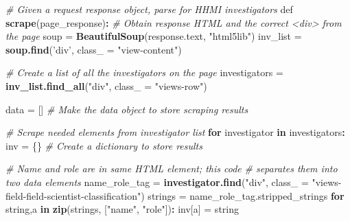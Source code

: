 \documentclass[]{krantz}
\newenvironment{Shaded}{\begin{snugshade}}{\end{snugshade}}
\newcommand{\KeywordTok}[1]{\textcolor[rgb]{0.13,0.29,0.53}{\textbf{#1}}}
\newcommand{\DataTypeTok}[1]{\textcolor[rgb]{0.13,0.29,0.53}{#1}}
\newcommand{\StringTok}[1]{\textcolor[rgb]{0.31,0.60,0.02}{#1}}
\newcommand{\CommentTok}[1]{\textcolor[rgb]{0.56,0.35,0.01}{\textit{#1}}}
\newcommand{\ControlFlowTok}[1]{\textcolor[rgb]{0.13,0.29,0.53}{\textbf{#1}}}
\newcommand{\OperatorTok}[1]{\textcolor[rgb]{0.81,0.36,0.00}{\textbf{#1}}}
\newcommand{\NormalTok}[1]{#1}
\begin{document}
\enlargethispage{12pt}

\begin{Shaded}
\begin{Highlighting}[]
\CommentTok{# Given a request response object, parse for HHMI investigators}
\NormalTok{def }\KeywordTok{scrape}\NormalTok{(page_response)}\OperatorTok{:}
\StringTok{   }\CommentTok{# Obtain response HTML and the correct <div> from the page}
\StringTok{   }\NormalTok{soup =}\StringTok{ }\KeywordTok{BeautifulSoup}\NormalTok{(response.text, }\StringTok{"html5lib"}\NormalTok{)}
\NormalTok{   inv_list =}\StringTok{ }\KeywordTok{soup.find}\NormalTok{(}\StringTok{'div'}\NormalTok{, }\DataTypeTok{class_ =} \StringTok{"view-content"}\NormalTok{)}

   \CommentTok{# Create a list of all the investigators on the page}
\NormalTok{   investigators =}\StringTok{ }\KeywordTok{inv_list.find_all}\NormalTok{(}\StringTok{"div"}\NormalTok{, }\DataTypeTok{class_ =} \StringTok{"views-row"}\NormalTok{)}

\NormalTok{   data =}\StringTok{ }\NormalTok{[] }\CommentTok{# Make the data object to store scraping results}

   \CommentTok{# Scrape needed elements from investigator list}
   \ControlFlowTok{for}\NormalTok{ investigator }\ControlFlowTok{in}\NormalTok{ investigators}\OperatorTok{:}
\StringTok{       }\NormalTok{inv =}\StringTok{ }\NormalTok{\{\} }\CommentTok{# Create a dictionary to store results}

       \CommentTok{# Name and role are in same HTML element; this code}
       \CommentTok{# separates them into two data elements}
\NormalTok{       name_role_tag =}\StringTok{ }\KeywordTok{investigator.find}\NormalTok{(}\StringTok{"div"}\NormalTok{,}
           \DataTypeTok{class_ =} \StringTok{"views-field-field-scientist-classification"}\NormalTok{)}
\NormalTok{       strings =}\StringTok{ }\NormalTok{name_role_tag.stripped_strings}
       \ControlFlowTok{for}\NormalTok{ string,a }\ControlFlowTok{in} \KeywordTok{zip}\NormalTok{(strings, [}\StringTok{"name"}\NormalTok{, }\StringTok{"role"}\NormalTok{])}\OperatorTok{:}
\StringTok{           }\NormalTok{inv[a] =}\StringTok{ }\NormalTok{string}


\end{Highlighting}
\end{Shaded}
\end{document}
